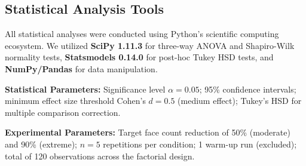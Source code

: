 \subsection{Statistical Analysis Tools}

All statistical analyses were conducted using Python's scientific computing ecosystem. We utilized \textbf{SciPy 1.11.3} for three-way ANOVA and Shapiro-Wilk normality tests, \textbf{Statsmodels 0.14.0} for post-hoc Tukey HSD tests, and \textbf{NumPy/Pandas} for data manipulation.

\textbf{Statistical Parameters:} Significance level $\alpha = 0.05$; 95\% confidence intervals; minimum effect size threshold Cohen's $d = 0.5$ (medium effect); Tukey's HSD for multiple comparison correction.

\textbf{Experimental Parameters:} Target face count reduction of 50\% (moderate) and 90\% (extreme); $n = 5$ repetitions per condition; 1 warm-up run (excluded); total of 120 observations across the factorial design.
